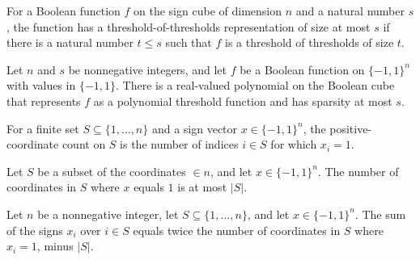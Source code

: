 \begin{definition}
\label{FABL.HasThresholdOfThresholdsSizeAtMost}
\leanok
{}
For a Boolean function $f$ on the sign cube of dimension $n$ and a natural number $s$,
the function has a threshold-of-thresholds representation of size at most $s$ if there
is a natural number $t\le s$ such that $f$ is a threshold of thresholds of size $t$.
\end{definition}

\begin{definition}
\label{FABL.IsThresholdOfParities}
\leanok
{}
Let $n$ and $s$ be nonnegative integers, and let $f$ be a Boolean function on
$\{-1,1\}^n$ with values in $\{-1,1\}$. There is a real-valued polynomial on the
Boolean cube that represents $f$ as a polynomial threshold function and has sparsity at
most $s$.
\end{definition}

\begin{definition}
\label{FABL.positiveCoordinateCountOn}
\leanok
For a finite set $S\subseteq\{1,\ldots,n\}$ and a sign vector $x\in\{-1,1\}^n$, the
positive-coordinate count on $S$ is the number of indices $i\in S$ for which $x_i=1$.
\end{definition}

\begin{theorem}
\label{FABL.positiveCoordinateCountOn_le}
\leanok
{}
Let $S$ be a subset of the coordinates $\in n$, and let $x\in\{-1,1\}^n$. The number
of coordinates in $S$ where $x$ equals $1$ is at most $|S|$.
\end{theorem}

\begin{theorem}
\label{FABL.sum_signValue_on_eq}
\leanok
{}
Let $n$ be a nonnegative integer, let $S\subseteq\{1,\ldots,n\}$, and let
$x\in\{-1,1\}^n$. The sum of the signs $x_i$ over $i\in S$ equals twice the number of
coordinates in $S$ where $x_i=1$, minus $|S|$.
\end{theorem}

